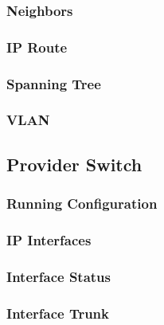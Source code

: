 \subsubsection{Neighbors}


\subsubsection{IP Route}


\subsubsection{Spanning Tree}


\subsubsection{VLAN}





\subsection{Provider Switch}
\subsubsection{Running Configuration}


\subsubsection{IP Interfaces}


\subsubsection{Interface Status}


\subsubsection{Interface Trunk}


